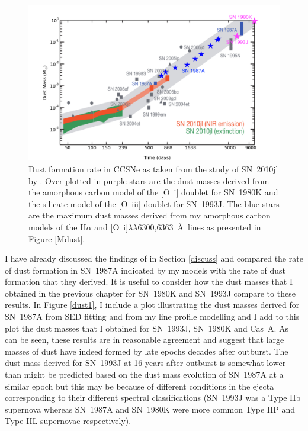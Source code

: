 \begin{figure}
\centering
\includegraphics[scale=0.55,clip=true, trim=50 0 60 30]{chapters/chapter7/figs/final_dust_plot2.png}
\caption{Dust formation rate in CCSNe as taken from the study of SN~2010jl by \citet{Gall2014}.  Over-plotted in purple stars are the dust masses derived from the amorphous carbon model of the [O~{\sc i}] doublet for SN~1980K and the silicate model of the [O~{\sc iii}] doublet for SN~1993J.  The blue stars are the maximum dust masses derived from my amorphous carbon models of the H$\alpha$ and [O~{\sc i}]$\lambda\lambda$6300,6363~\AA\ lines as presented in Figure \ref{Mdust}.}
\label{dust2}
\end{figure}

I have already discussed the findings of \citet{Wesson2015} in Section \ref{discuss} and compared the rate of dust formation in SN~1987A indicated by my models with the rate of dust formation that they derived.  It is useful to consider how the dust masses that I obtained in the previous chapter for SN~1980K and SN~1993J compare to these results.  In Figure \ref{dust1}, I include a plot illustrating the dust masses derived for SN~1987A from SED fitting and from my line profile modelling and I add to this plot the dust masses that I obtained for SN~1993J, SN~1980K and Cas~A.  As can be seen, these results are in reasonable agreement and suggest that large masses of dust have indeed formed by late epochs decades after outburst.  The dust mass derived for SN~1993J at 16 years after outburst is somewhat lower than might be predicted based on the dust mass evolution of SN~1987A at a similar epoch but this may be because of different conditions in the ejecta corresponding to their different spectral classifications (SN~1993J was a Type IIb supernova whereas SN~1987A and SN~1980K were more common Type IIP and Type IIL supernovae respectively).


